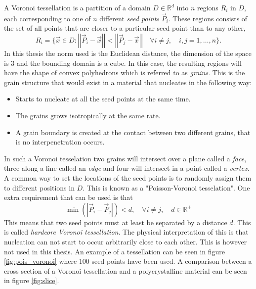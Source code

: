 \documentclass[micro_gen.tex]{subfiles}
\begin{document}
A Voronoi tessellation is a partition of a domain $D \in \mathbb{R}^d$ into $n$ regions $R_i$ in $D$, each corresponding to one of $n$ different \textit{seed points} $\vec{P}_i$. 
These regions consists of the set of all points that are closer to a particular seed point than to any other,
%
\[R_i = \{ \vec{x} \in D : \left|\left| \vec{P}_i - \vec{x} \right|\right| < \left|\left| \vec{P}_j - \vec{x} \right|\right| \quad  \forall i \neq j, \quad i,j = 1, \ldots, n \}. \]
%
In this thesis the norm used is the Euclidean distance, the dimension of the space is 3 and the bounding domain is a cube.
In this case, the resulting regions will have the shape of convex polyhedrons which is referred to as \textit{grains}. 
This is the grain structure that would exist in a material that nucleates in the following way:
\begin{itemize}
\item Starts to nucleate at all the seed points at the same time.
\item The grains grows isotropically at the same rate.
\item A grain boundary is created at the contact between two different grains, that is no interpenetration occurs.
\end{itemize}
In such a Voronoi tesselation two grains will intersect over a plane called a \textit{face},
three along a line called an \textit{edge} and four will intersect in a point called a \textit{vertex}. A common way to set the locations of the seed points is to randomly assign them to different positions in $D$. This is known as a "Poisson-Voronoi tesselation". One extra requirement that can be used is that 
%
\[ \min \left( |\vec{P}_i - \vec{P}_j| \right) < d, \quad \forall i \neq j, \quad d \in \mathbb{R}^+ \]
%
This means that two seed points must at least be separated by a distance $d$. This is called \textit{hardcore Voronoi tessellation}. The physical interpretation of this is that nucleation can not start to occur arbitrarily close to each other. This is however not used in this thesis. An example of a tessellation can be seen in figure \ref{fig:pois_voronoi} where 100 seed points have been used. A comparison between a cross section of a Voronoi tessellation and a polycrystalline material can be seen in figure \ref{fig:slice}.
\end{document}

